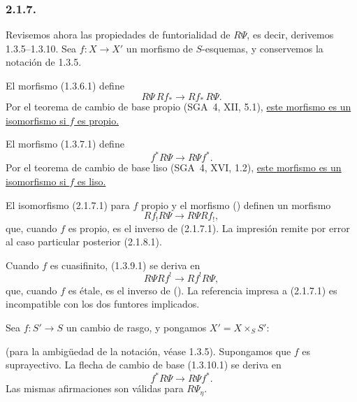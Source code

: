 \subsubsection*{2.1.7.}
Revisemos ahora las propiedades de funtorialidad de $R\Psi$, es decir,
derivemos 1.3.5--1.3.10. Sea $f:X\longrightarrow X'$ un morfismo de
$S$-esquemas, y conservemos la notación de 1.3.5.

El morfismo (1.3.6.1) define
\begin{equation}\tag{2.1.7.1}
R\Psi\,Rf_*\longrightarrow Rf_*\,R\Psi.
\end{equation}
Por el teorema de cambio de base propio (SGA~4, XII, 5.1),
\underline{este morfismo es un isomorfismo si $f$ es propio.}

El morfismo (1.3.7.1) define
\begin{equation}\tag{2.1.7.2}
f^*R\Psi\longrightarrow R\Psi f^*.
\end{equation}
Por el teorema de cambio de base liso (SGA~4, XVI, 1.2),
\underline{este morfismo es un isomorfismo si $f$ es liso.}

\pageoriginale

El isomorfismo (2.1.7.1) para $f$ propio y el morfismo
() definen un morfismo
\begin{equation}\tag{2.1.7.3}
Rf_!R\Psi\longrightarrow R\Psi Rf_!,
\end{equation}
que, cuando $f$ es propio, es el inverso de (2.1.7.1). La impresión remite
por error al caso particular posterior (2.1.8.1).

Cuando $f$ es cuasifinito, (1.3.9.1) se deriva en
\begin{equation}\tag{2.1.7.4}
R\Psi Rf^!\longrightarrow Rf^!R\Psi,
\end{equation}
que, cuando $f$ es étale, es el inverso de
(). La referencia impresa a (2.1.7.1) es incompatible
con los dos funtores implicados.

Sea $f:S'\longrightarrow S$ un cambio de rasgo, y pongamos
$X'=X\times_SS'$:
\begin{center}
\end{center}
(para la ambigüedad de la notación, véase 1.3.5). Supongamos que $f$ es
suprayectivo. La flecha de cambio de base (1.3.10.1) se deriva en
\begin{equation}\tag{2.1.7.5}
f^*R\Psi\longrightarrow R\Psi f^*.
\end{equation}
Las mismas afirmaciones son válidas para $R\Psi_\eta$.

